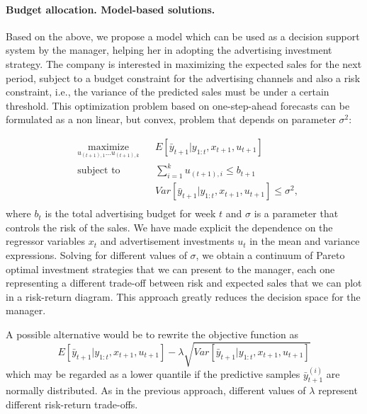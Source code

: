 

\paragraph{Budget allocation. Model-based solutions.}\label{section: budget allocation}

Based on the above, we propose a model which can be used as a decision support system by the manager, helping her in adopting the advertising investment strategy. The company is interested in maximizing the expected sales for the next period, subject to a budget constraint for the advertising channels and also a risk constraint, i.e., the variance of the predicted sales must be under a certain threshold.
This optimization problem based on one-step-ahead forecasts can be formulated as a non linear, but convex, problem that depends on  parameter $\sigma^2$:

\begin{equation*}
\begin{aligned}
& \underset{u_{(t+1),1}...u_{(t+1),k}}{\text{maximize}}
& &  E[ \bar{y}_{t+1} | y_{1:t}, x_{t+1}, u_{t+1}] \\
& \text{subject to}
& & \sum_{i=1}^k  u_{(t+1),i} \leq b_{t+1} \\
& & & Var[ \bar{y}_{t+1} | y_{1:t}, x_{t+1}, u_{t+1}] \leq \sigma^2, \\
\end{aligned}
\end{equation*}
where $b_t$ is the total advertising budget for week $t$ and $\sigma$ is a parameter that controls the risk of the sales. We have made explicit the dependence on the regressor variables $x_t$ and advertisement investments $u_t$ in the mean and variance expressions.
Solving for different values of $\sigma$, we obtain a continuum of Pareto optimal investment strategies that we can present to the manager, each one representing a different trade-off between risk and expected sales that we can plot in a risk-return diagram.
This approach greatly reduces the decision space for the manager.

A possible alternative would be to rewrite the objective function as 
$$E[ \bar{y}_{t+1} | y_{1:t}, x_{t+1}, u_{t+1}] - \lambda \sqrt{Var[ \bar{y}_{t+1} | y_{1:t}, x_{t+1}, u_{t+1}]}$$ 
which may be regarded as a lower quantile if the predictive samples $\bar{y}^{(i)}_{t+1}$ are normally distributed.
As in the previous approach, different values of $\lambda$ represent different risk-return trade-offs.

